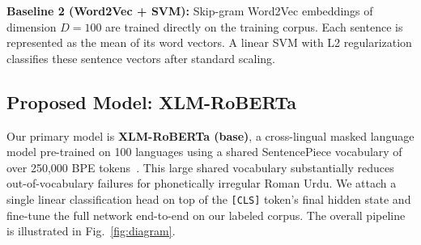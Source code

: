 \documentclass[conference]{IEEEtran}
\begin{document}
\textbf{Baseline 2 (Word2Vec + SVM):}
Skip-gram Word2Vec embeddings of dimension $D = 100$ are trained directly on the training corpus. Each sentence is represented as the mean of its word vectors. A linear SVM with L2 regularization classifies these sentence vectors after standard scaling.

\subsection{Proposed Model: XLM-RoBERTa}
Our primary model is \textbf{XLM-RoBERTa (base)}, a cross-lingual masked language model pre-trained on 100 languages using a shared SentencePiece vocabulary of over 250,000 BPE tokens~\cite{ref4}. This large shared vocabulary substantially reduces out-of-vocabulary failures for phonetically irregular Roman Urdu. We attach a single linear classification head on top of the \texttt{[CLS]} token's final hidden state and fine-tune the full network end-to-end on our labeled corpus. The overall pipeline is illustrated in Fig.~\ref{fig:diagram}.
\end{document}
